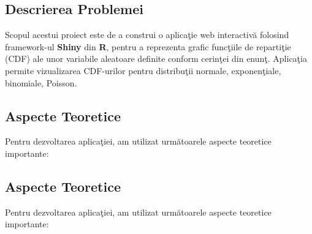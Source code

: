 \documentclass[a4paper,11pt]{article}
\begin{document}
\subsection*{Descrierea Problemei}

Scopul acestui proiect este de a construi o aplica\c{t}ie web interactiv\u{a} folosind framework-ul \textbf{Shiny} din \textbf{R}, pentru a reprezenta grafic func\c{t}iile de reparti\c{t}ie (CDF) ale unor variabile aleatoare definite conform cerin\c{t}ei din enun\c{t}. Aplica\c{t}ia permite vizualizarea CDF-urilor pentru distribu\c{t}ii normale, exponen\c{t}iale, binomiale, Poisson.

\subsection*{Aspecte Teoretice}
Pentru dezvoltarea aplica\c{t}iei, am utilizat urm\u{a}toarele aspecte teoretice importante:

\subsection*{Aspecte Teoretice}
Pentru dezvoltarea aplica\c{t}iei, am utilizat urm\u{a}toarele aspecte teoretice importante:
\end{document}
